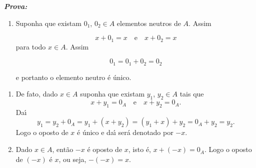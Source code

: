 \documentclass{beamer}
\begin{document}
    \begin{frame}
        \noindent \textbf{\textit{Prova:} }\pause
        \begin{enumerate}[label={\roman*})]
            \item Suponha que existam $0_1$, $0_2\in A$ elementos neutros de $A$. Assim
                
            \[
                x + 0_1 = x \quad \mbox{e}\quad x + 0_2 = x 
            \]
            para todo $x \in A$. Assim

            \[
                   0_1 = 0_1 + 0_2 = 0_2
            \]
            
            e portanto o elemento neutro \'e \'unico.
                
            \vspace{.5cm}

            \seti
        \end{enumerate}
    \end{frame}

    \begin{frame}
        \begin{enumerate}[label={\roman*})]
            \conti

            \item De fato, dado $x \in A$ suponha que existam $y_1$, $y_2\in A$ tais que
            \[
                x + y_1 = 0_A \quad \mbox{e}\quad x + y_2 = 0_A.
            \]
            Da{\'\i}
            \[
                y_1 = y_2 + 0_A = y_1 + (x + y_2) = (y_1 + x) + y_2 = 0_A + y_2 =y_2.
            \]
            Logo o oposto de $x$ \'e \'unico  e da{\'\i} ser\'a denotado por $-x$.
                
            \vspace{.5cm}

            \item Dado $x \in A$, ent\~ao $-x$ {\'e} oposto de $x$, isto {\'e}, $x + (-x) = 0_A$. Logo o oposto de $(-x)$ {\'e} $x$, ou seja, $-(-x) = x$.
            
            \seti
        \end{enumerate}
    \end{frame}
\end{document}

